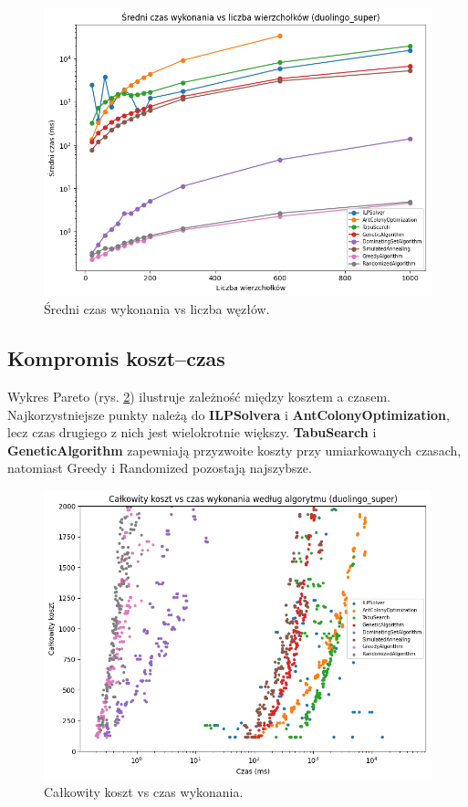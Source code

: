 \begin{figure}[H]
  \centering
  \includegraphics[width=0.7\linewidth]{assets/figures/synthetic_time_vs_nodes.png}
  \caption{Średni czas wykonania vs liczba węzłów.}
  \label{fig:synthetic_time_vs_nodes}
\end{figure}

\subsection{Kompromis koszt--czas}

Wykres Pareto (rys. \ref{fig:synthetic_pareto}) ilustruje zależność między kosztem a czasem. Najkorzystniejsze punkty należą do \textbf{ILPSolvera} i \textbf{AntColonyOptimization}, lecz czas drugiego z nich jest wielokrotnie większy. \textbf{TabuSearch} i \textbf{GeneticAlgorithm} zapewniają przyzwoite koszty przy umiarkowanych czasach, natomiast Greedy i Randomized pozostają najszybsze.

\begin{figure}[H]
  \centering
  \includegraphics[width=0.7\linewidth]{assets/figures/synthetic_pareto.png}
  \caption{Całkowity koszt vs czas wykonania.}
  \label{fig:synthetic_pareto}
\end{figure}

